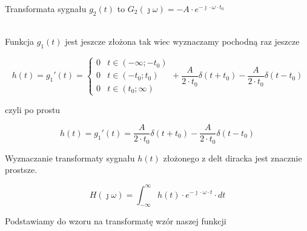 \begin{task}
Transformata sygnału $g_2(t)$ to $G_2(\jmath \omega)=-A \cdot e^{-\jmath \cdot \omega \cdot t_0}$

\\

Funkcja $g_1(t)$ jest jeszcze złożona tak wiec wyznaczamy pochodną raz jeszcze 

\begin{equation}
h(t)=g_1'(t)=\begin{cases}
0 & t \in \left( -\infty; -t_0 \right ) \\
0 & t \in \left( -t_0; t_0 \right ) \\
0 & t \in \left( t_0; \infty \right )
\end{cases} + \frac{A}{2\cdot t_0} \delta(t+t_0) - \frac{A}{2\cdot t_0} \delta(t-t_0)
\end{equation}

czyli po prostu

\begin{equation}
h(t)=g_1'(t)= \frac{A}{2\cdot t_0} \delta(t+t_0) - \frac{A}{2\cdot t_0} \delta(t-t_0)
\end{equation}

\begin{figure}[H]
  \centering
\end{figure}

Wyznaczanie transformaty sygnału $h(t)$ złożonego z delt diracka jest znacznie prostsze. 

\begin{equation}
H(\jmath \omega )=\int_{-\infty }^{\infty}h(t) \cdot e^{-\jmath \cdot \omega \cdot t}\cdot dt
\end{equation}

Podstawiamy do wzoru na transformatę wzór naszej funkcji


\end{task}
